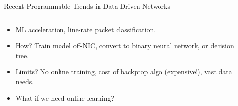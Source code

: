 \documentclass[aspectratio=169,xcolor={dvipsnames}
]{beamer}
\begin{document}
\begin{frame}{Recent Programmable Trends in Data-Driven Networks}
	\begin{columns}
		\begin{column}{0.6\linewidth}
			\begin{itemize}
				\item ML acceleration, line-rate packet classification.
				\item How? Train model off-NIC, convert to \alert{binary neural network}\footnotemark, or \alert{decision tree}\footnotemark.
				\item Limits? No online training, cost of backprop algo (expensive!), vast data needs.
				\item \alert{What if we need online learning?}
			\end{itemize}
		\end{column}
		\begin{column}{0.4\linewidth}
			\centering
		

\end{column}
\end{columns}
\end{frame}
\end{document}
